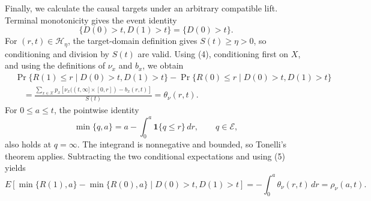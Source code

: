 Finally, we calculate the causal targets under an arbitrary compatible lift.  Terminal monotonicity gives the event identity
\[
 \{D(0)>t,D(1)>t\}=\{D(0)>t\}.                                                            \tag{4}
\]
For \((r,t)\in\mathcal H_\eta\), the target-domain definition gives \(S(t)\geq\eta>0\), so conditioning and division by \(S(t)\) are valid.  Using (4), conditioning first on \(X\), and using the definitions of \(\nu_x\) and \(b_x\), we obtain
\[
 \begin{aligned}
 &\Pr\{R(1)\leq r\mid D(0)>t,D(1)>t\}
 -\Pr\{R(0)\leq r\mid D(0)>t,D(1)>t\}\\
 &\quad=
 \frac{\sum_{x\in\mathcal X}p_x
 \left[\nu_x((t,\infty]\times[0,r])-b_x(r,t)\right]}{S(t)}
 =\theta_\nu(r,t).                                                                        \tag{5}
 \end{aligned}
\]
For \(0\leq a\leq t\), the pointwise identity
\[
 \min\{q,a\}=a-\int_0^a\mathbf 1\{q\leq r\}\,dr,
 \qquad q\in\mathcal E,
\]
also holds at \(q=\infty\).  The integrand is nonnegative and bounded, so Tonelli's theorem applies.  Subtracting the two conditional expectations and using (5) yields
\[
 E[\min\{R(1),a\}-\min\{R(0),a\}\mid D(0)>t,D(1)>t]
 =-\int_0^a\theta_\nu(r,t)\,dr
 =\rho_\nu(a,t).                                                                          \tag{6}
\]

